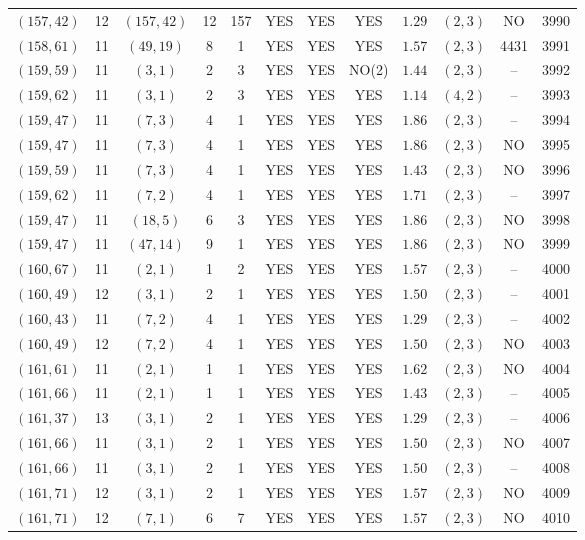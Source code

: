 \begin{longtable}{|c|c|c|c|c|c|c|c|c|c|c|c|}
$(157,42)$ & 12 & $(157,42)$ & 12 & 157 & YES & YES & YES & $1.29$ & $(2,3)$ & NO & 3990\\
$(158,61)$ & 11 & $(49,19)$ & 8 & 1 & YES & YES & YES & $1.57$ & $(2,3)$ & 4431 & 3991\\
$(159,59)$ & 11 & $(3,1)$ & 2 & 3 & YES & YES & NO(2) & $1.44$ & $(2,3)$ & -- & 3992\\
$(159,62)$ & 11 & $(3,1)$ & 2 & 3 & YES & YES & YES & $1.14$ & $(4,2)$ & -- & 3993\\
$(159,47)$ & 11 & $(7,3)$ & 4 & 1 & YES & YES & YES & $1.86$ & $(2,3)$ & -- & 3994\\
$(159,47)$ & 11 & $(7,3)$ & 4 & 1 & YES & YES & YES & $1.86$ & $(2,3)$ & NO & 3995\\
$(159,59)$ & 11 & $(7,3)$ & 4 & 1 & YES & YES & YES & $1.43$ & $(2,3)$ & NO & 3996\\
$(159,62)$ & 11 & $(7,2)$ & 4 & 1 & YES & YES & YES & $1.71$ & $(2,3)$ & -- & 3997\\
$(159,47)$ & 11 & $(18,5)$ & 6 & 3 & YES & YES & YES & $1.86$ & $(2,3)$ & NO & 3998\\
$(159,47)$ & 11 & $(47,14)$ & 9 & 1 & YES & YES & YES & $1.86$ & $(2,3)$ & NO & 3999\\
$(160,67)$ & 11 & $(2,1)$ & 1 & 2 & YES & YES & YES & $1.57$ & $(2,3)$ & -- & 4000\\
$(160,49)$ & 12 & $(3,1)$ & 2 & 1 & YES & YES & YES & $1.50$ & $(2,3)$ & -- & 4001\\
$(160,43)$ & 11 & $(7,2)$ & 4 & 1 & YES & YES & YES & $1.29$ & $(2,3)$ & -- & 4002\\
$(160,49)$ & 12 & $(7,2)$ & 4 & 1 & YES & YES & YES & $1.50$ & $(2,3)$ & NO & 4003\\
$(161,61)$ & 11 & $(2,1)$ & 1 & 1 & YES & YES & YES & $1.62$ & $(2,3)$ & NO & 4004\\
$(161,66)$ & 11 & $(2,1)$ & 1 & 1 & YES & YES & YES & $1.43$ & $(2,3)$ & -- & 4005\\
$(161,37)$ & 13 & $(3,1)$ & 2 & 1 & YES & YES & YES & $1.29$ & $(2,3)$ & -- & 4006\\
$(161,66)$ & 11 & $(3,1)$ & 2 & 1 & YES & YES & YES & $1.50$ & $(2,3)$ & NO & 4007\\
$(161,66)$ & 11 & $(3,1)$ & 2 & 1 & YES & YES & YES & $1.50$ & $(2,3)$ & -- & 4008\\
$(161,71)$ & 12 & $(3,1)$ & 2 & 1 & YES & YES & YES & $1.57$ & $(2,3)$ & NO & 4009\\
$(161,71)$ & 12 & $(7,1)$ & 6 & 7 & YES & YES & YES & $1.57$ & $(2,3)$ & NO & 4010\\

\end{longtable}
